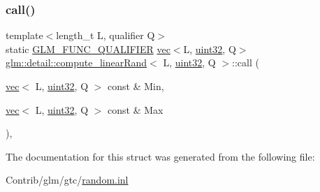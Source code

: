 \subsubsection{\texorpdfstring{call()}{call()}}
{\footnotesize\ttfamily template$<$length\+\_\+t L, qualifier Q$>$ \\
static \mbox{\hyperlink{setup_8hpp_a33fdea6f91c5f834105f7415e2a64407}{G\+L\+M\+\_\+\+F\+U\+N\+C\+\_\+\+Q\+U\+A\+L\+I\+F\+I\+ER}} \mbox{\hyperlink{structglm_1_1vec}{vec}}$<$L, \mbox{\hyperlink{namespaceglm_1_1detail_ade6cfbf377022aaa391af8cd50489222}{uint32}}, Q$>$ \mbox{\hyperlink{structglm_1_1detail_1_1compute__linear_rand}{glm\+::detail\+::compute\+\_\+linear\+Rand}}$<$ L, \mbox{\hyperlink{namespaceglm_1_1detail_ade6cfbf377022aaa391af8cd50489222}{uint32}}, Q $>$\+::call (\begin{DoxyParamCaption}\item[{\mbox{\hyperlink{structglm_1_1vec}{vec}}$<$ L, \mbox{\hyperlink{namespaceglm_1_1detail_ade6cfbf377022aaa391af8cd50489222}{uint32}}, Q $>$ const \&}]{Min,  }\item[{\mbox{\hyperlink{structglm_1_1vec}{vec}}$<$ L, \mbox{\hyperlink{namespaceglm_1_1detail_ade6cfbf377022aaa391af8cd50489222}{uint32}}, Q $>$ const \&}]{Max }\end{DoxyParamCaption})\hspace{0.3cm}{\ttfamily [inline]}, {\ttfamily [static]}}



The documentation for this struct was generated from the following file\+:\begin{DoxyCompactItemize}
\item 
Contrib/glm/gtc/\mbox{\hyperlink{random_8inl}{random.\+inl}}\end{DoxyCompactItemize}
